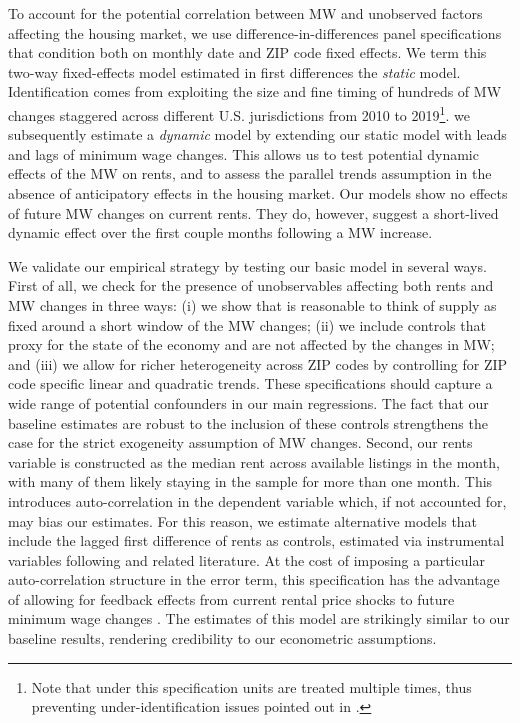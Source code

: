 To account for the potential correlation between MW and unobserved factors affecting the housing 
market, we use difference-in-differences panel specifications that condition both on 
monthly date and ZIP code fixed effects. We term this two-way fixed-effects model estimated in 
first differences the \textit{static} model. Identification comes from exploiting the size and 
fine timing of hundreds of MW changes staggered across different U.S. jurisdictions from 2010 
to 2019\footnote{Note that under this specification units are treated multiple times, thus 
	preventing under-identification issues pointed out in \textcite{BorusyakJaravel2017}.}. 
we subsequently estimate a \textit{dynamic} model by extending our static model with leads 
and lags of minimum wage changes. This allows us to test potential dynamic effects of the MW on 
rents, and to assess the parallel trends assumption in the absence of
anticipatory effects in the housing market. Our models show no effects of future MW changes 
on current rents. They do, however, suggest a short-lived dynamic effect over the first couple 
months following a MW increase.

We validate our empirical strategy by testing our basic model in several ways. First of 
all, we check for the presence of unobservables affecting both rents and MW changes in three 
ways: (i) we show that is reasonable to think of supply as fixed around a short window of the 
MW changes; (ii) we include controls that proxy for the state of the economy and are not 
affected by the changes in MW; and (iii) we allow for richer heterogeneity across ZIP codes 
by controlling for ZIP code specific linear and quadratic trends. 
These specifications should capture a wide range of potential confounders in our main 
regressions. The fact that our baseline estimates are robust to the inclusion of these 
controls strengthens the case for the strict exogeneity assumption of MW changes. Second, 
our rents variable is constructed as the median rent across available listings in the month, 
with many of them likely staying in the sample for more than one month. This introduces 
auto-correlation in the dependent variable which, if not accounted for, may bias our estimates. 
For this reason, we estimate alternative models that include the lagged first difference of rents 
as controls, estimated via instrumental variables following \textcite{ArellanoBond1991} and 
related literature. At the cost of imposing a particular auto-correlation structure in the 
error term, this specification has the advantage of allowing for feedback effects from current 
rental price shocks to future minimum wage changes \parencite{ArellanoHonore2001}. The estimates 
of this model are strikingly similar to our baseline results, rendering credibility to our 
econometric assumptions.


